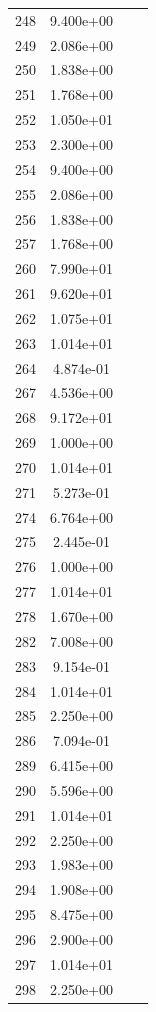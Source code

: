 \documentclass[12pt]{article}
\begin{document}
\begin{longtable}{@{}cccc@{}}
248 & 9.400e+00 &  &  \\
249 & 2.086e+00 &  &  \\
250 & 1.838e+00 &  &  \\
251 & 1.768e+00 &  &  \\
252 & 1.050e+01 &  &  \\
253 & 2.300e+00 &  &  \\
254 & 9.400e+00 &  &  \\
255 & 2.086e+00 &  &  \\
256 & 1.838e+00 &  &  \\
257 & 1.768e+00 &  &  \\
260 & 7.990e+01 &  &  \\
261 & 9.620e+01 &  &  \\
262 & 1.075e+01 &  &  \\
263 & 1.014e+01 &  &  \\
264 & 4.874e-01 &  &  \\
267 & 4.536e+00 &  &  \\
268 & 9.172e+01 &  &  \\
269 & 1.000e+00 &  &  \\
270 & 1.014e+01 &  &  \\
271 & 5.273e-01 &  &  \\
274 & 6.764e+00 &  &  \\
275 & 2.445e-01 &  &  \\
276 & 1.000e+00 &  &  \\
277 & 1.014e+01 &  &  \\
278 & 1.670e+00 &  &  \\
282 & 7.008e+00 &  &  \\
283 & 9.154e-01 &  &  \\
284 & 1.014e+01 &  &  \\
285 & 2.250e+00 &  &  \\
286 & 7.094e-01 &  &  \\
289 & 6.415e+00 &  &  \\
290 & 5.596e+00 &  &  \\
291 & 1.014e+01 &  &  \\
292 & 2.250e+00 &  &  \\
293 & 1.983e+00 &  &  \\
294 & 1.908e+00 &  &  \\
295 & 8.475e+00 &  &  \\
296 & 2.900e+00 &  &  \\
297 & 1.014e+01 &  &  \\
298 & 2.250e+00 &  &  \\

\end{longtable}
\end{document}
